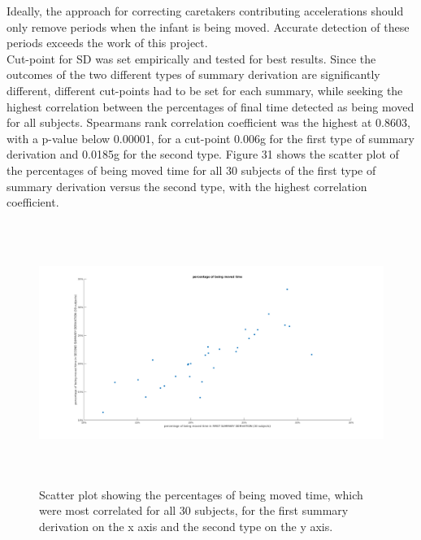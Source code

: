\documentclass{article}
\begin{document}
{Ideally, the approach for correcting caretakers contributing accelerations should only remove periods when the infant is being moved. Accurate detection of these periods exceeds the work of this project.\\Cut-point for SD was set empirically and tested for best results. Since the outcomes of the two different types of summary derivation are significantly different, different cut-points had to be set for each summary, while seeking the highest correlation between the percentages of final time detected as being moved for all subjects. Spearmans rank correlation coefficient was the highest at 0.8603, with a p-value below 0.00001, for a cut-point 0.006g for the first type of summary derivation and 0.0185g for the second type. Figure 31 shows the scatter plot of the percentages of being moved time for all 30 subjects of the first type of summary derivation versus the second type, with the highest correlation coefficient.
\begin{figure}[h!]
\includegraphics[width=15cm, height=8.5cm]{approach_E_correlation_being_moved.png}
\caption{Scatter plot showing the percentages of being moved time, which were most correlated for all 30 subjects, for the first summary derivation on the x axis and the second type on the y axis.}
\end{figure}

}
\end{document}
